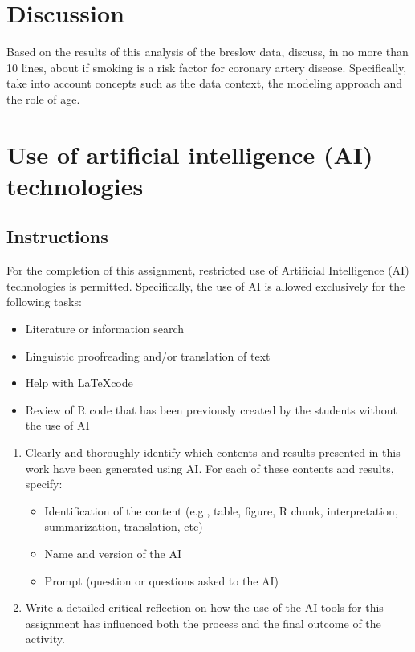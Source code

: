 \documentclass[10pt,a4paper,twoside]{article}\usepackage[]{graphicx}\usepackage[]{xcolor}
\begin{document}
\section{Discussion}
\label{sec:Discussion}

Based on the results of this analysis of the breslow data, discuss, in no more than 10 lines, about if smoking is a risk factor for coronary artery disease. Specifically, take into account concepts such as the data context, the modeling approach and the role of age.

\section{Use of artificial intelligence (AI) technologies}
\label{sec:AIuse}
\subsection{Instructions}
\label{sec:Instructions}
For the completion of this assignment, restricted use of Artificial Intelligence (AI) technologies is permitted. Specifically, the use of AI is allowed exclusively for the following tasks:

\begin{itemize}
    \item Literature or information search
    \item Linguistic proofreading and/or translation of text
    \item Help with \LaTeX code
    \item Review of R code that has been previously created by the students without the use of AI
\end{itemize}
\begin{enumerate}
    \item Clearly and thoroughly identify which contents and results presented in this work have been generated using AI. For each of these contents and results, specify:
    \begin{itemize}
        \item  Identification of the content (e.g., table, figure, R chunk, interpretation, summarization, translation, etc)
        \item Name and version of the AI
        \item Prompt (question or questions asked to the AI)
    \end{itemize}
    \item Write a detailed critical reflection on how the use of the AI tools for this assignment has influenced both the process and the final outcome of the activity.
\end{enumerate}
\end{document}
